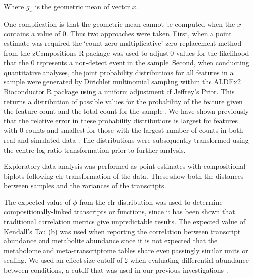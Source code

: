 \documentclass[10pt,letterpaper]{article}
\begin{document}
Where $g_x$ is the geometric mean of vector $x$.

One complication is that the geometric mean cannot be computed when the $x$ contains a value of 0. Thus two approaches were taken. First, when a point estimate was required  the `count zero multiplicative' zero replacement method from the zCompositions R package \cite{PalareaAlbaladejo201585} was used to adjust 0 values for the likelihood that the 0 represents a non-detect event in the sample. Second, when conducting quantitative analyses, the joint probability distributions for all features in a sample were generated by Dirichlet multinomial sampling within the ALDEx2 Bioconductor R package  \cite{fernandes:2013} using a uniform adjustment of Jeffrey's Prior. This returns a distribution of possible values for the probability of  the feature given the feature count and the total count for the sample \cite{fernandes:2013, gloorAJS:2016}. We have shown previously that the relative error in these probability distributions is largest for features with 0 counts and smallest for those with the largest number of counts in both real and simulated data \cite{fernandes:2013}. The distributions were subsequently transformed using the centre log-ratio transformation  prior to further analysis. 

Exploratory data analysis was performed as point estimates with compositional biplots \cite{aitchison2002biplots} following clr transformation of the data. These show both the distances between samples and the variances of the transcripts.

The expected value of $\phi$ \cite{Lovell:2015} from the clr distribution was used to determine compositionally-linked transcripts or functions, since it has been shown that traditional correlation metrics give unpredictable results\cite{pawlowsky2015modeling,pawlowsky2011compositional}. The expected value of Kendall's Tau (b) was used when reporting the correlation between transcript abundance and metabolite abundance since it is not expected that the metabolome and meta-transcriptome tables share even passingly similar units or scaling. We used an effect size cutoff of 2 when evaluating differential abundance between conditions, a cutoff that was used in our previous investigations \cite{macklaim:2013}. 
\end{document}
